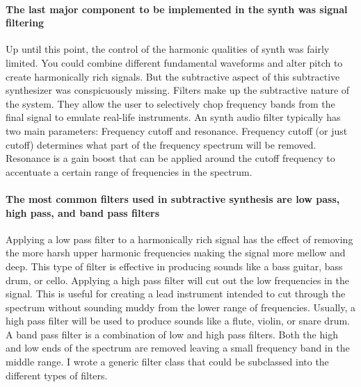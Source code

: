 \documentclass[acmlarge,screen]{acmart}
\begin{document}
	\paragraph{The last major component to be implemented in the synth was signal filtering} Up until this point, the control of the harmonic qualities of synth was fairly limited. You could combine different fundamental waveforms and alter pitch to create harmonically rich signals. But the subtractive aspect of this subtractive synthesizer was conspicuously missing. Filters make up the subtractive nature of the system. They allow the user to selectively chop frequency bands from the final signal to emulate real-life instruments.\cite{welsh_2006} An synth audio filter typically has two main parameters: Frequency cutoff and resonance. Frequency cutoff (or just cutoff) determines what part of the frequency spectrum will be removed. Resonance is a gain boost that can be applied around the cutoff frequency to accentuate a certain range of frequencies in the spectrum. \cite{musictech}

	\paragraph{The most common filters used in subtractive synthesis are low pass, high pass, and band pass filters} Applying a low pass filter to a harmonically rich signal has the effect of removing the more harsh upper harmonic frequencies making the signal more mellow and deep. This type of filter is effective in producing sounds like a bass guitar, bass drum, or cello. Applying a high pass filter will cut out the low frequencies in the signal. This is useful for creating a lead instrument intended to cut through the spectrum without sounding muddy from the lower range of frequencies. Usually, a high pass filter will be used to produce sounds like a flute, violin, or snare drum. A band pass filter is a combination of low and high pass filters. Both the high and low ends of the spectrum are removed leaving a small frequency band in the middle range. I wrote a generic filter class that could be subclassed into the different types of filters. \cite{hass_2021} \cite{lacamera_2020}
	
\end{document}
